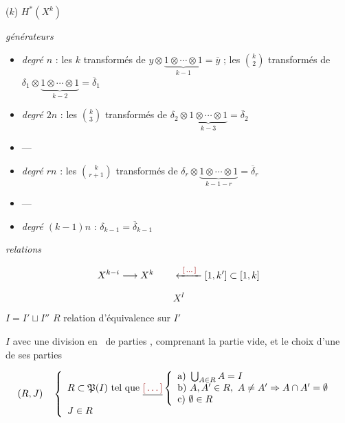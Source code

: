\documentclass[11pt,a4paper]{article}
\begin{document}

($k$) $H^{*}(X^{k})$ 

\emph{générateurs}
\begin{itemize}
  \item \emph{degré $n$} : les $k$ transformés de
  $y \otimes \underbrace{1 \otimes \cdots \otimes 1}_{k-1} = \overline{y}$ ;
  les $\binom{k}{2}$ transformés de
  $\delta_{1} \otimes \underbrace{1 \otimes \cdots \otimes 1}_{k-2} = \overline{\delta}_{1}$
  \item \emph{degré $2n$} : les $\binom{k}{3}$ transformés de
  $\delta_{2} \otimes \underbrace{1 \otimes \cdots \otimes 1}_{k-3} = \overline{\delta}_{2}$
  \item ---
  \item \emph{degré $rn$} : les $\binom{k}{r+1}$ transformés de
  $\delta_{r} \otimes \underbrace{1 \otimes \cdots \otimes 1}_{k-1-r} = \overline{\delta}_{r}$
  \item ---
  \item \emph{degré $(k-1)n$} : $\delta_{k-1} = \overline{\delta}_{k-1}$
\end{itemize}


\emph{relations}


\[
  X^{k-i} \longrightarrow X^{k}
  \qquad
  \xleftarrow{\ \ill{}\ } [1, k'] \subset [1, k]
\]

\[
  X^{I}
\]

$I = I' \sqcup I''$ \qquad $R$ relation d'équivalence sur $I'$

$I$ avec une division en \ de parties ,
comprenant la partie vide, et le choix d'une de ses parties

\[
  (R, J) \quad
  \left\{
  \begin{array}{l}
    R \subset \mathfrak{P}(I) \text{ tel que } \struck{\ill{}}
    \left\{
    \begin{array}{l}
      \text{a)}\ \bigcup_{A \in R} A = I \\
      \text{b)}\ A, A' \in R,\ A \neq A' \Rightarrow A \cap A' = \emptyset \\
      \text{c)}\ \emptyset \in R
    \end{array}
    \right. \\[1ex]
    J \in R
  \end{array}
  \right.
\]
\end{document}
